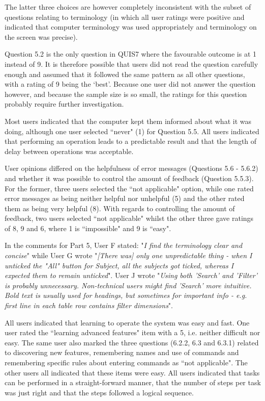 The latter three choices are however completely inconsistent with the subset of questions relating to terminology (in which all user ratings were positive and indicated that computer terminology was used appropriately and terminology on the screen was precise). 

Question 5.2 is the only question in QUIS7 where the favourable outcome is at 1 instead of 9. It is therefore possible that users did not read the question carefully enough and assumed that it followed the same pattern as all other questions, with a rating of 9 being the ‘best'. Because one user did not answer the question however, and because the sample size is so small, the ratings for this question probably require further investigation. 

Most users indicated that the computer kept them informed about what it was doing, although one user selected ``never" (1) for Question 5.5. All users indicated that performing an operation leads to a predictable result and that the length of delay between operations was acceptable. 

User opinions differed on the helpfulness of error messages (Questions 5.6 - 5.6.2) and whether it was possible to control the amount of feedback (Question 5.5.3). For the former, three users selected the ``not applicable" option, while one rated error messages as being neither helpful nor unhelpful (5) and the other rated them as being very helpful (8). With regards to controlling the amount of feedback, two users selected ``not applicable" whilst the other three gave ratings of 8, 9 and 6, where 1 is ``impossible" and 9 is ``easy".	

In the comments for Part 5, User F stated: "\textit{I find the terminology clear and concise}" while User G wrote "\textit{[There was] only one unpredictable thing - when I unticked the "All" button for Subject, all the subjects got ticked, whereas I expected them to remain unticked}". User J wrote "\textit{Using both 'Search' and 'Filter' is probably unnecessary. Non-technical users might find 'Search' more intuitive. Bold text is usually used for headings, but sometimes for important info - e.g. first line in each table row contains filter dimensions}".

All users indicated that learning to operate the system was easy and fast. One user rated the ``learning advanced features" item with a 5, i.e. neither difficult nor easy. The same user also marked the three questions (6.2.2, 6.3 and 6.3.1) related to discovering new features, remembering names and use of commands and remembering specific rules about entering commands as ``not applicable". The other users all indicated that these items were easy. All users indicated that tasks can be performed in a straight-forward manner, that the number of  steps per task was just right and that the steps followed a logical sequence. 

